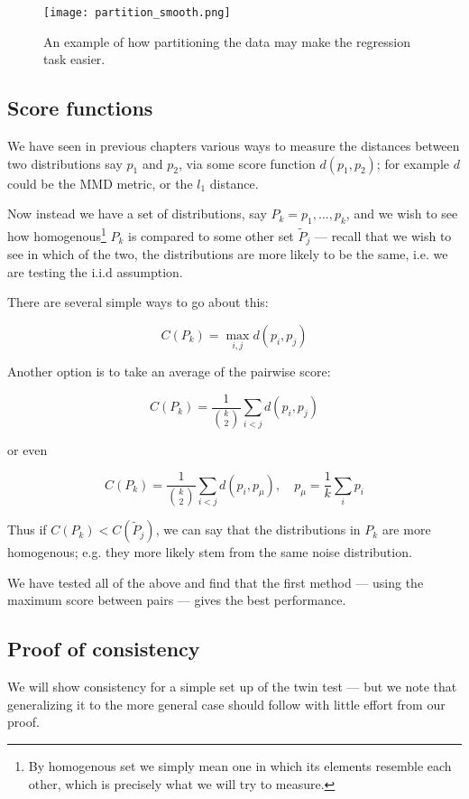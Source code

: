 \begin{figure}[H]
    \centering
    \texttt{[image: partition\_smooth.png]}
    \caption{An example of how partitioning the data may make the regression task easier.}
\end{figure}


\subsection{Score functions}

We have seen in previous chapters various ways to measure the distances between two distributions say 
$p_1$ and $p_2$, via some score function $d(p_1, p_2)$; for example $d$ could be the 
MMD metric, or the $l_1$ distance.

Now instead we have a set of distributions, say $P_k = p_1, ..., p_k$, and we wish to see how homogenous\footnote{
    By homogenous set we simply mean one in which its elements resemble each other, which is precisely what we will try to measure. 
}
$P_k$ is compared to some other set $\tilde{P}_j$ ---  recall that we wish to see in which of the two, 
 the distributions are more likely to be the same, i.e. we are testing the i.i.d assumption. 

There are several simple ways to go about this:

$$
    C(P_k) = \operatorname{max}_{i, j} d(p_i, p_j)
$$

Another option is to take an average of the pairwise score:

$$
    C(P_k) = \frac{1}{\binom{k}{2}} \sum_{i < j} d(p_i, p_j)
$$

or even 

$$
    C(P_k) = \frac{1}{\binom{k}{2}} \sum_{i < j} d(p_i, p_\mu)
    , \quad p_\mu = \frac{1}{k} \sum_i p_i
$$


Thus if $C(P_k) < C(\tilde{P}_j)$, we can say that the distributions in $P_k$ are
more homogenous; e.g. they more likely stem from the same noise distribution. 

We have tested all of the above and find that the first method ---  using the maximum score between pairs ---
gives the best performance.




\subsection{Proof of consistency}

We will show consistency for a simple set up of the twin test ---  but we note that generalizing it to the more 
general case should follow with little effort from our proof. 


